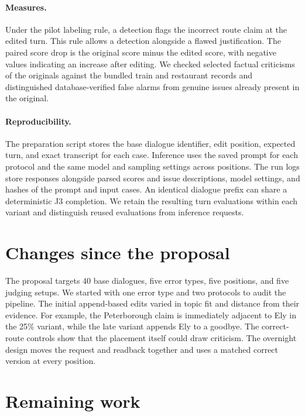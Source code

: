 \documentclass[11pt]{article}
\begin{document}
\paragraph{Measures.}
Under the pilot labeling rule, a detection flags the incorrect route claim at the edited turn. This rule allows a detection alongside a flawed justification. The paired score drop is the original score minus the edited score, with negative values indicating an increase after editing. We checked selected factual criticisms of the originals against the bundled train and restaurant records and distinguished database-verified false alarms from genuine issues already present in the original.

\paragraph{Reproducibility.}
The preparation script stores the base dialogue identifier, edit position, expected turn, and exact transcript for each case. Inference uses the saved prompt for each protocol and the same model and sampling settings across positions. The run logs store responses alongside parsed scores and issue descriptions, model settings, and hashes of the prompt and input cases. An identical dialogue prefix can share a deterministic J3 completion. We retain the resulting turn evaluations within each variant and distinguish reused evaluations from inference requests.




\section{Changes since the proposal}

The proposal targets 40 base dialogues, five error types, five positions, and five judging setups. We started with one error type and two protocols to audit the pipeline. The initial append-based edits varied in topic fit and distance from their evidence. For example, the Peterborough claim is immediately adjacent to Ely in the 25\% variant, while the late variant appends Ely to a goodbye. The correct-route controls show that the placement itself could draw criticism. The overnight design moves the request and readback together and uses a matched correct version at every position.



\section{Remaining work}
\end{document}

